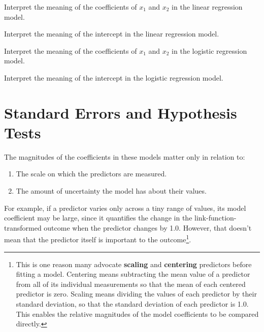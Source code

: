 \begin{question}{}
Interpret the meaning of the coefficients of $x_1$ and $x_2$ in the linear regression model.
\end{question}

\begin{question}{}
Interpret the meaning of the intercept in the linear regression model.
\end{question}

\begin{question}{}
Interpret the meaning of the coefficients of $x_1$ and $x_2$ in the logistic regression model.
\end{question}

\begin{question}{}
Interpret the meaning of the intercept in the logistic regression model.
\end{question}


\section{Standard Errors and Hypothesis Tests \label{section:sehyp}}

The magnitudes of the coefficients in these models matter only in relation to:
\begin{enumerate}
\item The scale on which the predictors are measured. 
\item The amount of uncertainty the model has about their values.
\end{enumerate}
For example, if a predictor varies only across a tiny range of values, its model coefficient may be large, since it quantifies the change in the link-function-transformed outcome when the predictor changes by 1.0. However, that doesn't mean that the predictor itself is important to the outcome\footnote{This is one reason many advocate \textbf{scaling} and \textbf{centering} predictors before fitting a model. Centering means subtracting the mean value of a predictor from all of its individual measurements so that the mean of each centered predictor is zero. Scaling means dividing the values of each predictor by their standard deviation, so that the standard deviation of each predictor is 1.0. This enables the relative magnitudes of the model coefficients to be compared directly.}.

